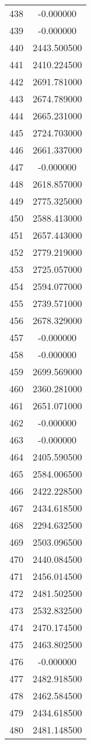 \documentclass[12pt]{article}
\begin{document}
\begin{longtable}{@{}cc@{}}
438 & -0.000000 \\
439 & -0.000000 \\
440 & 2443.500500 \\
441 & 2410.224500 \\
442 & 2691.781000 \\
443 & 2674.789000 \\
444 & 2665.231000 \\
445 & 2724.703000 \\
446 & 2661.337000 \\
447 & -0.000000 \\
448 & 2618.857000 \\
449 & 2775.325000 \\
450 & 2588.413000 \\
451 & 2657.443000 \\
452 & 2779.219000 \\
453 & 2725.057000 \\
454 & 2594.077000 \\
455 & 2739.571000 \\
456 & 2678.329000 \\
457 & -0.000000 \\
458 & -0.000000 \\
459 & 2699.569000 \\
460 & 2360.281000 \\
461 & 2651.071000 \\
462 & -0.000000 \\
463 & -0.000000 \\
464 & 2405.590500 \\
465 & 2584.006500 \\
466 & 2422.228500 \\
467 & 2434.618500 \\
468 & 2294.632500 \\
469 & 2503.096500 \\
470 & 2440.084500 \\
471 & 2456.014500 \\
472 & 2481.502500 \\
473 & 2532.832500 \\
474 & 2470.174500 \\
475 & 2463.802500 \\
476 & -0.000000 \\
477 & 2482.918500 \\
478 & 2462.584500 \\
479 & 2434.618500 \\
480 & 2481.148500 \\

\end{longtable}
\end{document}
